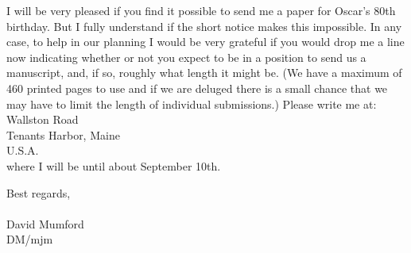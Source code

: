 I will be very pleased if you find it possible to send me a paper for Oscar's 80th birthday. But I fully understand if the short notice makes this impossible. In any case, to help in our planning I would be very grateful if you would drop me a line now indicating whether or not you expect to be in a position to send us a manuscript, and, if so, roughly what length it might be. (We have a maximum of 460 printed pages to use and if we are deluged there is a small chance that we may have to limit the length of individual submissions.) Please write me at:\\
Wallston Road\\
Tenants Harbor, Maine\\
U.S.A.\\

where I will be until about September 10th.

Best regards,\\
\\
David Mumford\\

DM/mjm


